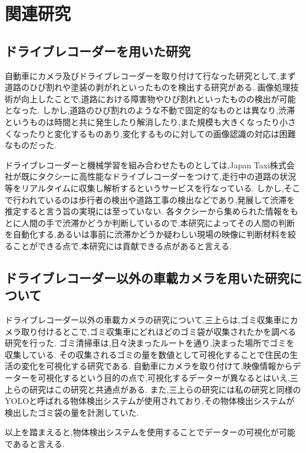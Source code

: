 \chapter{関連研究}
\section{ドライブレコーダーを用いた研究}
自動車にカメラ及びドライブレコーダーを取り付けて行なった研究として,まず道路のひび割れや塗装の剥がれといったものを検出する研究\cite{全邦釘2017ディープラーニングおよび}がある.
画像処理技術が向上したことで,道路における障害物やひび割れといったものの検出が可能となった.
しかし,道路のひび割れのような不動で固定的なものとは異なり,渋滞というものは時間と共に発生したり解消したり,また規模も大きくなったり小さくなったりと変化するものあり,変化するものに対しての画像認識の対応は困難なものだった.

ドライブレコーダーと機械学習を組み合わせたものとしては,Japan Taxi株式会社が既にタクシーに高性能なドライブレコーダーをつけて,走行中の道路の状況等をリアルタイムに収集し解析するというサービスを行なっている\cite{japantaxi}.
しかし,そこで行われているのは歩行者の検出や道路工事の検出などであり,発展して渋滞を推定すると言う旨の実現には至っていない.
各タクシーから集められた情報をもとに人間の手で渋滞かどうか判断しているので,本研究によってその人間の判断を自動化する,あるいは事前に渋滞かどうか疑わしい現場の映像に判断材料を絞ることができる点で,本研究には貢献できる点があると言える.

\section{ドライブレコーダー以外の車載カメラを用いた研究について}
ドライブレコーダー以外の車載カメラの研究について,三上ら\cite{三上量弘2020deepcounter}は,ゴミ収集車にカメラ取り付けるとこで,ゴミ収集車にどれほどのゴミ袋が収集されたかを調べる研究を行った.
ゴミ清掃車は,日々決まったルートを通り,決まった場所でゴミを収集している.
その収集されるゴミの量を数値として可視化することで住民の生活の変化を可視化する研究である.
自動車にカメラを取り付けて,映像情報からデーターを可視化するという目的の点で,可視化するデーターが異なるとはいえ,三上らの研究はこの研究と共通点がある.
また,三上らの研究には私の研究と同様のYOLOと呼ばれる物体検出システムが使用されており,その物体検出システムが検出したゴミ袋の量を計測していた.

以上を踏まえると,物体検出システムを使用することでデーターの可視化が可能であると言える.

